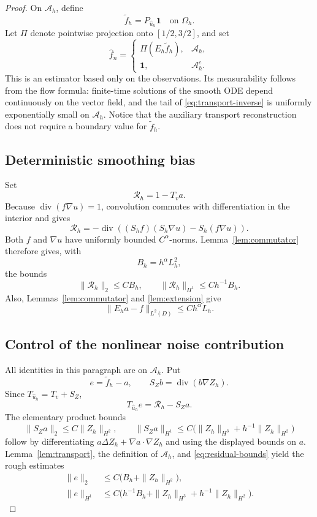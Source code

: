 \documentclass[11pt]{article}
\theoremstyle{remark}
\newcommand{\one}{\mathbf 1}
\DeclareMathOperator{\divergence}{div}
\begin{document}
\begin{proof}
On \(\mathcal A_h\), define
\[
\widetilde f_h=P_{\widehat u_h}\one
\quad\text{on }\Omega_h.
\]
Let \(\Pi\) denote pointwise projection onto \([1/2,3/2]\), and set
\[
\widehat f_n=
\begin{cases}
\Pi(E_h\widetilde f_h),&\mathcal A_h,\\
\one,&\mathcal A_h^c.
\end{cases}
\]
This is an estimator based only on the observations.
Its measurability follows from the flow formula:
finite-time solutions of the smooth ODE depend continuously on the
vector field, and the tail of \eqref{eq:transport-inverse} is uniformly
exponentially small on \(\mathcal A_h\).
Notice that the auxiliary transport reconstruction does not require
a boundary value for \(\widetilde f_h\).

\subsection*{Deterministic smoothing bias}

Set
\[
\mathcal R_h=1-T_va.
\]
Because \(\divergence(f\nabla u)=1\), convolution commutes with
differentiation in the interior and gives
\[
\mathcal R_h
=-\divergence\left((S_hf)(S_h\nabla u)-S_h(f\nabla u)\right).
\]
Both \(f\) and \(\nabla u\) have uniformly bounded \(C^\alpha\)-norms.
Lemma~\ref{lem:commutator} therefore gives, with
\[
B_h=h^\alpha L_h^2,
\]
the bounds
\begin{equation}\label{eq:residual-bounds}
\|\mathcal R_h\|_2\leq CB_h,\qquad
\|\mathcal R_h\|_{H^1}\leq Ch^{-1}B_h.
\end{equation}
Also, Lemmas~\ref{lem:commutator} and \ref{lem:extension} give
\begin{equation}\label{eq:completed-bias}
\|E_ha-f\|_{L^2(D)}\leq Ch^\alpha L_h.
\end{equation}

\subsection*{Control of the nonlinear noise contribution}

All identities in this paragraph are on \(\mathcal A_h\).
Put
\[
e=\widetilde f_h-a,\qquad
S_Zb=\divergence(b\nabla Z_h).
\]
Since \(T_{\widehat u_h}=T_v+S_Z\),
\begin{equation}\label{eq:error-equation}
T_{\widehat u_h}e=\mathcal R_h-S_Za.
\end{equation}
The elementary product bounds
\[
\|S_Za\|_2\leq C\|Z_h\|_{H^2},
\qquad
\|S_Za\|_{H^1}
\leq C\big(\|Z_h\|_{H^3}+h^{-1}\|Z_h\|_{H^2}\big)
\]
follow by differentiating \(a\Delta Z_h+\nabla a\cdot\nabla Z_h\)
and using the displayed bounds on \(a\).
Lemma~\ref{lem:transport}, the definition of \(\mathcal A_h\),
and \eqref{eq:residual-bounds} yield the rough estimates
\begin{align}
\|e\|_2
&\leq C\big(B_h+\|Z_h\|_{H^2}\big),
\label{eq:rough-L2}\\
\|e\|_{H^1}
&\leq C\big(
h^{-1}B_h+\|Z_h\|_{H^3}
+h^{-1}\|Z_h\|_{H^2}\big).
\label{eq:rough-H1}
\end{align}


\end{proof}
\end{document}
